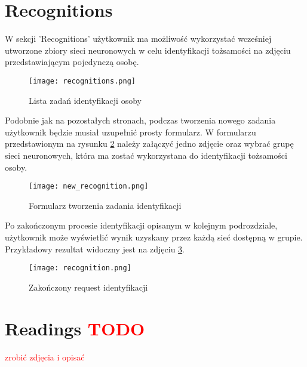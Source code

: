 \section{Recognitions}
W sekcji 'Recognitions' użytkownik ma możliwość wykorzystać wcześniej utworzone zbiory sieci neuronowych w celu identyfikacji tożsamości na zdjęciu przedstawiającym pojedynczą osobę.
\begin{figure}[H]
	\centering
	\texttt{[image: recognitions.png]}
	\caption{Lista zadań identyfikacji osoby}
	\label{fig:recognitions}
\end{figure}
Podobnie jak na pozostałych stronach, podczas tworzenia nowego zadania użytkownik będzie musiał uzupełnić prosty formularz. W formularzu przedstawionym na rysunku \ref{fig:new_recognition} należy załączyć jedno zdjęcie oraz wybrać grupę sieci neuronowych, która ma zostać wykorzystana do identyfikacji tożsamości osoby.
\begin{figure}[H]
	\centering
	\texttt{[image: new\_recognition.png]}
	\caption{Formularz tworzenia zadania identyfikacji}
	\label{fig:new_recognition}
\end{figure}
Po zakończonym procesie identyfikacji opisanym w kolejnym podrozdziale, użytkownik może wyświetlić wynik uzyskany przez każdą sieć dostępną w grupie. Przykładowy rezultat widoczny jest na zdjęciu \ref{fig:recognition}.
\begin{figure}[H]
	\centering
	\texttt{[image: recognition.png]}
	\caption{Zakończony request identyfikacji}
	\label{fig:recognition}
\end{figure}

\section{Readings \textcolor{red}{TODO}}
\textcolor{red}{zrobić zdjęcia i opisać}